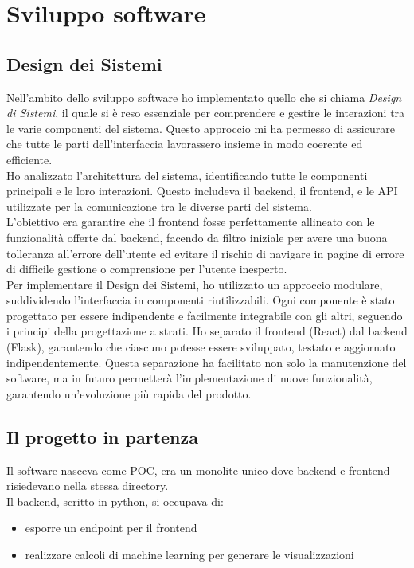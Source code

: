 \chapter{Sviluppo software}
\label{cap:sviluppo-software}

\section{Design dei Sistemi}
Nell'ambito dello sviluppo software ho implementato quello che si chiama \textit{Design di Sistemi}, il quale si è reso essenziale per comprendere e gestire le interazioni tra le varie componenti del sistema. Questo approccio mi ha permesso di assicurare che tutte le parti dell'interfaccia lavorassero insieme in modo coerente ed efficiente.\\
Ho analizzato l'architettura del sistema, identificando tutte le componenti principali e le loro interazioni. Questo includeva il backend, il frontend, e le API utilizzate per la comunicazione tra le diverse parti del sistema.\\
L'obiettivo era garantire che il frontend fosse perfettamente allineato con le funzionalità offerte dal backend, facendo da filtro iniziale per avere una buona tolleranza all'errore dell'utente ed evitare il rischio di navigare in pagine di errore di difficile gestione o comprensione per l'utente 
inesperto. \\

Per implementare il Design dei Sistemi, ho utilizzato un approccio modulare, suddividendo l'interfaccia in componenti riutilizzabili. Ogni componente è stato progettato per essere indipendente e facilmente integrabile con gli altri, seguendo i principi della progettazione a strati. Ho separato il frontend (React) dal backend (Flask), garantendo che ciascuno potesse essere sviluppato, testato e aggiornato indipendentemente. Questa separazione ha facilitato non solo la manutenzione del software, ma in futuro permetterà l'implementazione di nuove funzionalità, garantendo un'evoluzione più rapida del prodotto.\\


\section{Il progetto in partenza}
Il software nasceva come POC, era un monolite unico dove backend e frontend risiedevano nella stessa directory.\\
Il backend, scritto in python, si occupava di:
\begin{itemize}
    \item esporre un endpoint per il frontend 
    \item realizzare calcoli di machine learning per generare le visualizzazioni 
\end{itemize}

